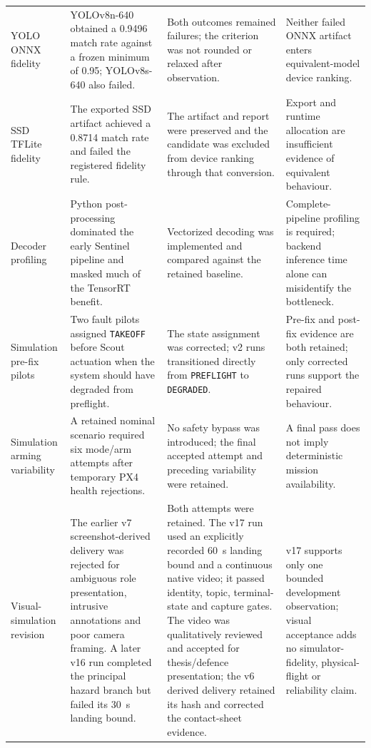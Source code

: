 {\begin{longtable}{@{}p{}p{}p{}p{}@{}}
  YOLO ONNX fidelity & YOLOv8n-640 obtained a 0.9496 match rate against a frozen
  minimum of 0.95; YOLOv8s-640 also failed. & Both outcomes remained failures;
  the criterion was not rounded or relaxed after observation. & Neither failed
  ONNX artifact enters equivalent-model device ranking. \\

  SSD TFLite fidelity & The exported SSD artifact achieved a 0.8714 match rate
  and failed the registered fidelity rule. & The artifact and report were
  preserved and the candidate was excluded from device ranking through that
  conversion. & Export and runtime allocation are insufficient evidence of
  equivalent behaviour. \\

  Decoder profiling & Python post-processing dominated the early Sentinel
  pipeline and masked much of the TensorRT benefit. & Vectorized decoding was
  implemented and compared against the retained baseline. & Complete-pipeline
  profiling is required; backend inference time alone can misidentify the
  bottleneck. \\

  Simulation pre-fix pilots & Two fault pilots assigned \texttt{TAKEOFF} before
  Scout actuation when the system should have degraded from preflight. & The
  state assignment was corrected; v2 runs transitioned directly from
  \texttt{PREFLIGHT} to \texttt{DEGRADED}. & Pre-fix and post-fix evidence are
  both retained; only corrected runs support the repaired behaviour. \\

  Simulation arming variability & A retained nominal scenario required six
  mode/arm attempts after temporary PX4 health rejections. & No safety bypass
  was introduced; the final accepted attempt and preceding variability were
  retained. & A final pass does not imply deterministic mission availability. \\

  Visual-simulation revision & The earlier v7 screenshot-derived delivery was
  rejected for ambiguous role presentation, intrusive annotations and poor
  camera framing. A later v16 run completed the principal hazard branch but
  failed its 30~s landing bound. & Both attempts were retained. The v17 run
  used an explicitly recorded 60~s landing bound and a continuous native video;
  it passed identity, topic, terminal-state and capture gates. The video was
  qualitatively reviewed and accepted for thesis/defence presentation; the v6 derived
  delivery retained its hash and corrected the contact-sheet evidence. &
  v17 supports only one bounded development observation; visual acceptance adds
  no simulator-fidelity, physical-flight or reliability claim. \\


\end{longtable}}
